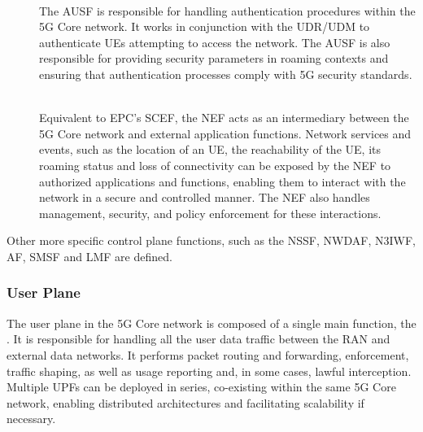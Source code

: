 \begin{description}
  \item[\normalfont\uline{}]~\\ 
  The \gls{AUSF} is responsible for handling authentication procedures within the 5G Core network. It works in conjunction with the \gls{UDR}/\gls{UDM} to authenticate \glspl{UE}  attempting to access the network. The \gls{AUSF} is also responsible for providing security parameters in roaming contexts and ensuring that authentication processes comply with 5G security standards. 
  \item[\normalfont\uline{}]~\\ 
  Equivalent to \gls{EPC}'s \gls{SCEF}, the \gls{NEF} acts as an intermediary between the 5G Core network and external application functions. Network services and events, such as the location of an \gls{UE}, the reachability of the \gls{UE}, its roaming status and loss of connectivity can be exposed by the \gls{NEF} to authorized applications and functions, enabling them to interact with the network in a secure and controlled manner. The \gls{NEF} also handles  management, security, and policy enforcement for these interactions.
\end{description}
Other more specific control plane functions, such as the \gls{NSSF}, \gls{NWDAF}, \gls{N3IWF}, \gls{AF}, \gls{SMSF} and \gls{LMF} are defined.

\subsubsection{User Plane}
\label{sec:user_plane}
The user plane in the 5G Core network is composed of a single main function, the . It is responsible for handling all the user data traffic between the \gls{RAN} and external data networks. It performs packet routing and forwarding,  enforcement, traffic shaping, as well as usage reporting and, in some cases, lawful interception. Multiple \glspl{UPF} can be deployed in series, co-existing within the same 5G Core network, enabling distributed architectures and facilitating scalability if necessary. 

